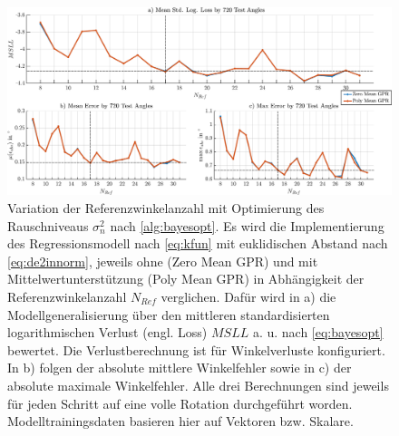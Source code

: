 \clearpage
\begin{figure}[tph]
	\centering
	\includegraphics[width=\linewidth]{chapters/images/4-EuOExp/MSLL-vs-Errors}
	\caption[Variation der Referenzwinkelanzahl mit Optimierung des Rauschniveau]{Variation der Referenzwinkelanzahl mit Optimierung des Rauschniveaus $\sigma_n^2$ nach \autoref{alg:bayesopt}. Es wird die Implementierung des Regressionsmodell nach \autoref{eq:kfun} mit euklidischen Abstand nach \autoref{eq:de2innorm}, jeweils ohne (Zero Mean GPR) und mit Mittelwertunterstützung (Poly Mean GPR) in Abhängigkeit der Referenzwinkelanzahl $N_{Ref}$ verglichen. Dafür wird in a) die Modellgeneralisierung über den mittleren standardisierten logarithmischen Verlust (engl. Loss) $MSLL$ a. u. nach \autoref{eq:bayesopt} bewertet. Die Verlustberechnung ist für Winkelverluste konfiguriert. In b) folgen der absolute mittlere Winkelfehler sowie in c) der absolute maximale Winkelfehler. Alle drei Berechnungen sind jeweils für jeden Schritt auf eine volle Rotation durchgeführt worden. Modelltrainingsdaten basieren hier auf Vektoren bzw. Skalare.}
	\label{fig:msll-vs-errors}
\end{figure}


\clearpage

